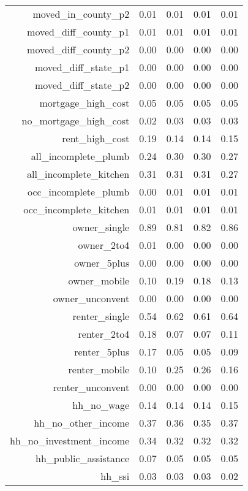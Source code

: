 \begin{table}[ht]
\begin{tabular}{rrrrr}
      moved\_in\_county\_p2 & 0.01 & 0.01 & 0.01 & 0.01 \\ 
      moved\_diff\_county\_p1 & 0.01 & 0.01 & 0.01 & 0.01 \\ 
      moved\_diff\_county\_p2 & 0.00 & 0.00 & 0.00 & 0.00 \\ 
      moved\_diff\_state\_p1 & 0.00 & 0.00 & 0.00 & 0.00 \\ 
      moved\_diff\_state\_p2 & 0.00 & 0.00 & 0.00 & 0.00 \\ 
      mortgage\_high\_cost & 0.05 & 0.05 & 0.05 & 0.05 \\ 
      no\_mortgage\_high\_cost & 0.02 & 0.03 & 0.03 & 0.03 \\ 
      rent\_high\_cost & 0.19 & 0.14 & 0.14 & 0.15 \\ 
      all\_incomplete\_plumb & 0.24 & 0.30 & 0.30 & 0.27 \\ 
      all\_incomplete\_kitchen & 0.31 & 0.31 & 0.31 & 0.27 \\ 
      occ\_incomplete\_plumb & 0.00 & 0.01 & 0.01 & 0.01 \\ 
      occ\_incomplete\_kitchen & 0.01 & 0.01 & 0.01 & 0.01 \\ 
      owner\_single & 0.89 & 0.81 & 0.82 & 0.86 \\ 
      owner\_2to4 & 0.01 & 0.00 & 0.00 & 0.00 \\ 
      owner\_5plus & 0.00 & 0.00 & 0.00 & 0.00 \\ 
      owner\_mobile & 0.10 & 0.19 & 0.18 & 0.13 \\ 
      owner\_unconvent & 0.00 & 0.00 & 0.00 & 0.00 \\ 
      renter\_single & 0.54 & 0.62 & 0.61 & 0.64 \\ 
      renter\_2to4 & 0.18 & 0.07 & 0.07 & 0.11 \\ 
      renter\_5plus & 0.17 & 0.05 & 0.05 & 0.09 \\ 
      renter\_mobile & 0.10 & 0.25 & 0.26 & 0.16 \\ 
      renter\_unconvent & 0.00 & 0.00 & 0.00 & 0.00 \\ 
      hh\_no\_wage & 0.14 & 0.14 & 0.14 & 0.15 \\ 
      hh\_no\_other\_income & 0.37 & 0.36 & 0.35 & 0.37 \\ 
      hh\_no\_investment\_income & 0.34 & 0.32 & 0.32 & 0.32 \\ 
      hh\_public\_assistance & 0.07 & 0.05 & 0.05 & 0.05 \\ 
      hh\_ssi & 0.03 & 0.03 & 0.03 & 0.02 \\ 

\end{tabular}
\end{table}
